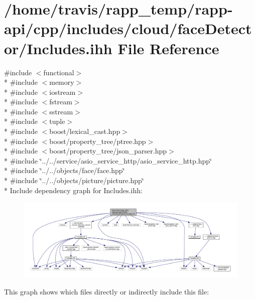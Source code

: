 \hypertarget{cloud_2faceDetector_2Includes_8ihh}{\section{/home/travis/rapp\-\_\-temp/rapp-\/api/cpp/includes/cloud/face\-Detector/\-Includes.ihh File Reference}
\label{cloud_2faceDetector_2Includes_8ihh}
}
{\ttfamily \#include $<$functional$>$}\\*
{\ttfamily \#include $<$memory$>$}\\*
{\ttfamily \#include $<$iostream$>$}\\*
{\ttfamily \#include $<$fstream$>$}\\*
{\ttfamily \#include $<$sstream$>$}\\*
{\ttfamily \#include $<$tuple$>$}\\*
{\ttfamily \#include $<$boost/lexical\-\_\-cast.\-hpp$>$}\\*
{\ttfamily \#include $<$boost/property\-\_\-tree/ptree.\-hpp$>$}\\*
{\ttfamily \#include $<$boost/property\-\_\-tree/json\-\_\-parser.\-hpp$>$}\\*
{\ttfamily \#include \char`\"{}../../service/asio\-\_\-service\-\_\-http/asio\-\_\-service\-\_\-http.\-hpp\char`\"{}}\\*
{\ttfamily \#include \char`\"{}../../objects/face/face.\-hpp\char`\"{}}\\*
{\ttfamily \#include \char`\"{}../../objects/picture/picture.\-hpp\char`\"{}}\\*
Include dependency graph for Includes.\-ihh\-:
\nopagebreak
\begin{figure}[H]
\begin{center}
\leavevmode
\includegraphics[width=350pt]{cloud_2faceDetector_2Includes_8ihh__incl}
\end{center}
\end{figure}
This graph shows which files directly or indirectly include this file\-:
